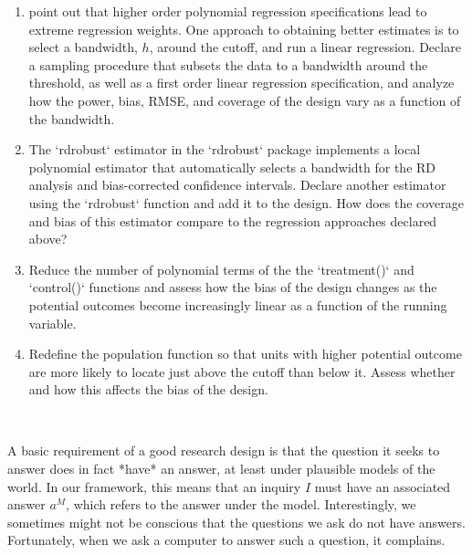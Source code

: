 \documentclass[11pt]{article}\usepackage[]{graphicx}\usepackage[]{color}
\begin{document}
\begin{enumerate}
\item \citet{gelman2017high} point out that higher order polynomial regression specifications lead to extreme regression weights. One approach to obtaining better estimates is to select a bandwidth, $h$, around the cutoff, and run a linear regression. Declare a sampling procedure that subsets the data to a bandwidth around the threshold, as well as a first order linear regression specification, and analyze how the power, bias, RMSE, and coverage of the design vary as a function of the bandwidth. 
  
\item The `rdrobust` estimator in the `rdrobust` package implements a local polynomial estimator that automatically selects a bandwidth for the RD analysis and bias-corrected confidence intervals. Declare another estimator using the `rdrobust` function and add it to the design. How does the coverage and bias of this estimator compare to the regression approaches declared above?

\item Reduce the number of polynomial terms of the the `treatment()` and `control()` functions and assess how the bias of the design changes as the potential outcomes become increasingly linear as a function of the running variable.
  
\item Redefine the population function so that units with higher potential outcome are more likely to locate just above the cutoff than below it. Assess whether and how this affects the bias of the design.
\end{enumerate}



\clearpage
 \\

\noindent A basic requirement of a good research design is that the question it seeks to answer does in fact *have* an answer, at least under plausible models of the world. In our framework, this means that an inquiry $I$ must have an associated answer $a^M$, which refers to the answer under the model. Interestingly, we sometimes might not be conscious that the questions we ask do not have answers. Fortunately, when we ask a computer to answer such a question, it complains.
\end{document}
